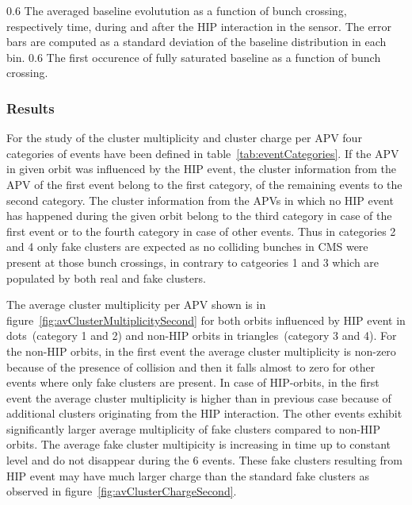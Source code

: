                  {0.6}       %
                 {The averaged baseline evolutution as a function of bunch crossing, respectively time, during and after the HIP interaction in the sensor. The error bars are computed as a standard deviation of the baseline distribution in each bin.  } %
                 {0.6}       %
                 { The first occurence of fully saturated baseline as a function of bunch crossing. } %
 
\subsubsection{Results}

For the study of the cluster multiplicity and cluster charge per APV four categories of events have been defined in table~\ref{tab:eventCategories}. If the APV in given orbit was influenced by the HIP event, the cluster information from the APV of the first event belong to the first category, of the remaining events to the second category. The cluster information from the APVs in which no HIP event has happened during the given orbit belong to the third category in case of the first event or to the fourth category in case of other events. Thus in categories 2 and 4 only fake clusters are expected as no colliding bunches in CMS were present at those bunch crossings, in contrary to catgeories 1 and 3 which are populated by both real and fake clusters.

The average cluster multiplicity per APV shown is in figure~\ref{fig:avClusterMultiplicitySecond} for both orbits influenced by HIP event in dots~(category 1 and 2) and non-HIP orbits in triangles~(category 3 and 4). For the non-HIP orbits, in the first event the average cluster multiplicity is non-zero because of the presence of collision and then it falls almost to zero for other events where only fake clusters are present. In case of HIP-orbits, in the first event the average cluster multiplicity is higher than in previous case because of additional clusters originating from the HIP interaction. The other events exhibit significantly larger average multiplicity of fake clusters compared to non-HIP orbits. The average fake cluster multipicity is increasing in time up to constant level and do not disappear during the 6 events. These fake clusters resulting from HIP event may have much larger charge than the standard fake clusters as observed in figure~\ref{fig:avClusterChargeSecond}. 

